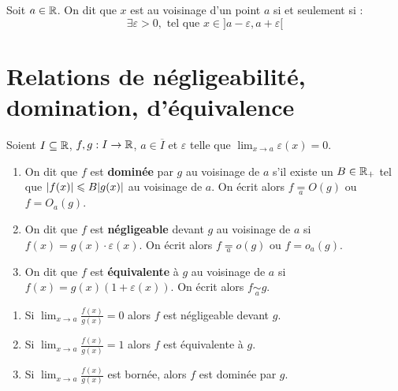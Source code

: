 \begin{definition} 
    Soit $a \in \mathbb{R}$.
    On dit que $x$ est au voisinage d'un point $a$ si et seulement si :
    \[ \exists \varepsilon > 0, \text{ tel que } x \in ]a - \varepsilon, a + \varepsilon[ \]
\end{definition}

\section{Relations de négligeabilité, domination, d'équivalence}
\begin{definition}
    Soient $I \subseteq \mathbb{R}$, $f, g : I \to \mathbb{R}$, $a \in \overline{I}$ et $\varepsilon$ telle que $\lim_{x \to a} \varepsilon(x) = 0$.
    \begin{enumerate}
        \item On dit que $f$ est \textbf{dominée} par $g$ au voisinage de $a$ s'il existe un $B \in \mathbb{R}_+$ tel que $\abs{f(x)} \leqslant B \abs{g(x)}$ au voisinage de $a$. 
        On écrit alors $f \underset{a}{=} O(g)$ ou $f = O_a(g)$.
        \item On dit que $f$ est \textbf{négligeable} devant $g$ au voisinage de $a$ si $f(x) = g(x) \cdot \varepsilon(x)$.
        On écrit alors $f \underset{a}{=} o(g)$ ou $f = o_a(g)$.
        \item On dit que $f$ est \textbf{équivalente} à $g$ au voisinage de $a$ si $f(x) = g(x) (1 + \varepsilon(x))$.
        On écrit alors $f \underset{a}{\sim} g$.
    \end{enumerate}
\end{definition}

\begin{proposition}
    \begin{enumerate}
        \item Si $\lim_{x \to a} \frac{f(x)}{g(x)} = 0$ alors $f$ est négligeable devant $g$.
        \item Si $\lim_{x \to a} \frac{f(x)}{g(x)} = 1$ alors $f$ est équivalente à $g$.
        \item Si $\lim_{x \to a} \frac{f(x)}{g(x)}$ est bornée, alors $f$ est dominée par $g$.
    \end{enumerate}   
\end{proposition}

